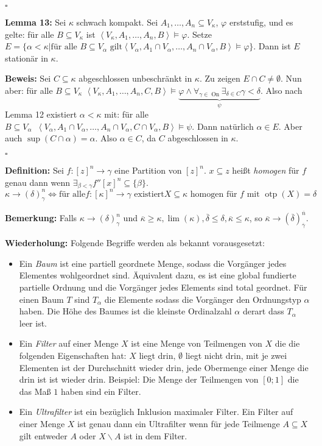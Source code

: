 \documentclass[a4paper,fontsize=11pt]{scrartcl}
\newcommand{\On}{\operatorname{On}}
\newcommand{\otp}{\operatorname{otp}}
\begin{document}
\hfill $\square$

{\bf Lemma 13:} Sei $\kappa$ schwach kompakt. Sei
$A_1,\ldots,A_n\subseteq V_\kappa$, $\varphi$ erststufig, und es
gelte: für alle $B\subseteq V_\kappa$ ist
$\left<V_\kappa,A_1,\ldots,A_n,B\right>\models\varphi$. Setze
$E=\{\alpha<\kappa|\mbox{für alle }B\subseteq V_\alpha\mbox{ gilt
}\left<V_\alpha,A_1\cap V_\alpha,\ldots,A_n\cap V_\alpha,
B\right>\models\varphi\}$. Dann ist $E$ stationär in $\kappa$.

{\bf Beweis:} Sei $C\subseteq\kappa$ abgeschlossen unbeschränkt in
$\kappa$. Zu zeigen $E\cap C\neq\emptyset$. Nun aber: für alle
$B\subseteq V_\kappa$
$\left<V_\kappa,A_1,\ldots,A_n,C,B\right>\models\underbrace{\varphi\wedge\forall_{\gamma\in\On}\exists_{\delta\in
    C}\gamma<\delta}_\psi$. Also nach Lemma 12 existiert
$\alpha<\kappa$ mit: für alle $B\subseteq
V_\alpha\phantom{a}\left<V_\alpha,A_1\cap V_\alpha,\ldots,A_n\cap
V_\alpha,C\cap V_\alpha, B\right>\models\psi$. Dann natürlich
$\alpha\in E$. Aber auch $\sup(C\cap\alpha)=\alpha$. Also $\alpha\in
C$, da $C$ abgeschlossen in $\kappa$.

\hfill $\square$

{\bf Definition:} Sei $f:[z]^n\rightarrow\gamma$ eine Partition von
$[z]^n$. $x\subseteq z$ heißt {\it homogen} für $f$ genau dann wenn
$\exists_{\beta<\gamma} f''[x]^n\subseteq\{\beta\}$.
$$ \kappa \rightarrow (\delta)_\gamma^n \Leftrightarrow \mbox{für alle
} f:[\kappa]^n\rightarrow\gamma\mbox{ existiert
}X\subseteq\kappa\mbox{ homogen für }f\mbox{ mit }\otp(X)=\delta $$

{\bf Bemerkung:} Falls $\kappa\rightarrow(\delta)_\gamma^n$ und
$\overline{\kappa}\ge\kappa,\lim(\kappa),\overline{\delta}\le\delta,\overline{\kappa}\le\kappa$,
so
$\overline{\kappa}\rightarrow(\overline{\delta})_{\overline{\gamma}}^{\overline{n}}$.

{\bf Wiederholung:}
Folgende Begriffe werden als bekannt vorausgesetzt:
\begin{itemize}
\item Ein {\it Baum} ist eine partiell geordnete Menge, sodass die
  Vorgänger jedes Elementes wohlgeordnet sind. Äquivalent dazu, es ist
  eine global fundierte partielle Ordnung und die Vorgänger jedes
  Elements sind total geordnet. Für einen Baum $T$ sind $T_\alpha$ die
  Elemente sodass die Vorgänger den Ordnungstyp $\alpha$ haben. Die
  Höhe des Baumes ist die kleinste Ordinalzahl $\alpha$ derart dass
  $T_\alpha$ leer ist.
\item Ein {\it Filter} auf einer Menge $X$ ist eine Menge von
  Teilmengen von $X$ die die folgenden Eigenschaften hat: $X$ liegt
  drin, $\emptyset$ liegt nicht drin, mit je zwei Elementen ist der
  Durchschnitt wieder drin, jede Obermenge einer Menge die drin ist
  ist wieder drin. Beispiel: Die Menge der Teilmengen von $[0;1]$ die
  das Maß $1$ haben sind ein Filter.
\item Ein {\it Ultrafilter} ist ein bezüglich Inklusion maximaler
  Filter. Ein Filter auf einer Menge $X$ ist genau dann ein
  Ultrafilter wenn für jede Teilmenge $A\subseteq X$ gilt entweder $A$
  oder $X\backslash A$ ist in dem Filter.
\end{itemize}
\end{document}
